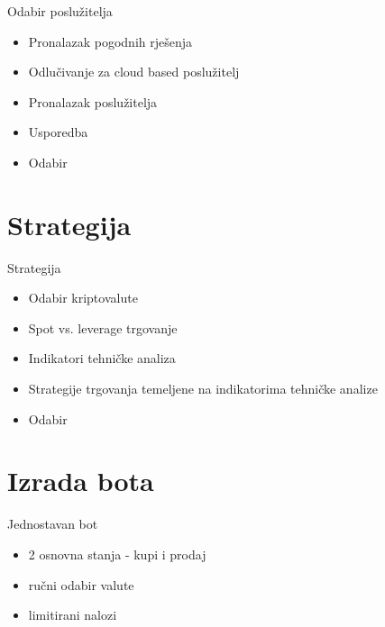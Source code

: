 \documentclass[aspectratio=169,xcolor=dvipsnames]{beamer}
\begin{document}
\begin{frame}{Odabir poslužitelja}
    \begin{itemize}
        \item Pronalazak pogodnih rješenja
        \item Odlučivanje za cloud based poslužitelj
        \item Pronalazak poslužitelja
        \item Usporedba
        \item Odabir
    \end{itemize}
\end{frame}

\section{Strategija}

\begin{frame}{Strategija}
    \begin{itemize}
        \item Odabir kriptovalute
        \item Spot vs. leverage trgovanje
        \item Indikatori tehničke analiza
        \item Strategije trgovanja temeljene na indikatorima tehničke analize
        \item Odabir
    \end{itemize}
\end{frame}

\section{Izrada bota}

\begin{frame}{Jednostavan bot}
    \begin{itemize}
        \item 2 osnovna stanja - kupi i prodaj
        \item ručni odabir valute
        \item limitirani nalozi
        \end{itemize}
    \end{frame}

\end{document}
